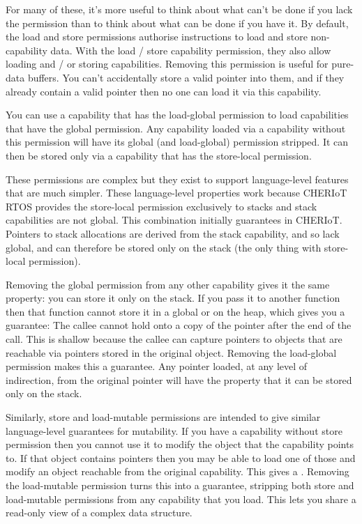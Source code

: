 For many of these, it's more useful to think about what can't be done if you lack the permission than to think about what can be done if you have it.
By default, the load and store permissions authorise instructions to load and store non-capability data.
With the load / store capability permission, they also allow loading and / or storing capabilities.
Removing this permission is useful for pure-data buffers.
You can't accidentally store a valid pointer into them, and if they already contain a valid pointer then no one can load it via this capability. 

You can use a capability that has the load-global permission to load capabilities that have the global permission.
Any capability loaded via a capability without this permission will have its global (and load-global) permission stripped.
It can then be stored only via a capability that has the store-local permission.

These permissions are complex but they exist to support language-level features that are much simpler.
These language-level properties work because CHERIoT RTOS provides the store-local permission exclusively to stacks and stack capabilities are not global.
This combination initially guarantees  in CHERIoT.
Pointers to stack allocations are derived from the stack capability, and so lack global, and can therefore be stored only on the stack (the only thing with store-local permission).

Removing the global permission from any other capability gives it the same property: you can store it only on the stack.
If you pass it to another function then that function cannot store it in a global or on the heap, which gives you a  guarantee:
The callee cannot hold onto a copy of the pointer after the end of the call.
This is shallow because the callee can capture pointers to objects that are reachable via pointers stored in the original object.
Removing the load-global permission makes this a  guarantee.
Any pointer loaded, at any level of indirection, from the original pointer will have the property that it can be stored only on the stack.

Similarly, store and load-mutable permissions are intended to give similar language-level guarantees for mutability.
If you have a capability without store permission then you cannot use it to modify the object that the capability points to.
If that object contains pointers then you may be able to load one of those and modify an object reachable from the original capability.
This gives a .
Removing the load-mutable permission turns this into a  guarantee, stripping both store and load-mutable permissions from any capability that you load.
This lets you share a read-only view of a complex data structure.

